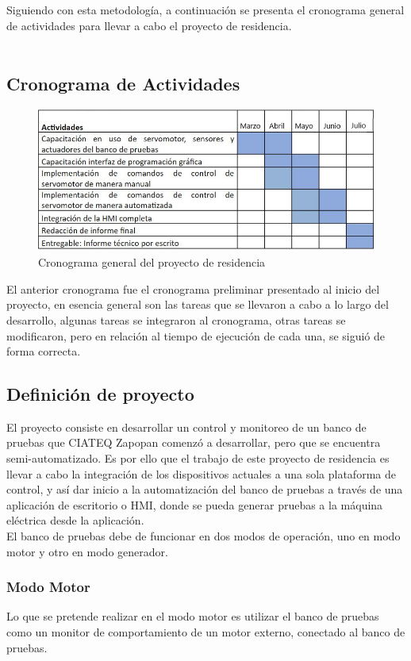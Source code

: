 \documentclass[12pt,titlepage]{article}
\begin{document}
Siguiendo con esta metodología, a  continuación se presenta el cronograma general de actividades para llevar a cabo el proyecto de residencia. \\ \\
\subsection{Cronograma de Actividades}
\begin{figure}[htbp]
\hspace*{0.8cm} 
\includegraphics[scale=0.70]{cronograma}
\caption{Cronograma general del proyecto de residencia}
\end{figure}


El anterior cronograma fue el cronograma preliminar presentado al inicio del proyecto, en esencia general son las tareas que se llevaron a cabo a lo largo del desarrollo, algunas tareas se integraron al cronograma, otras tareas se modificaron, pero en relación al tiempo de ejecución de cada una, se siguió de forma correcta. \\
\newpage
\subsection{Definición de proyecto}
El proyecto consiste en desarrollar un control y monitoreo de un banco de pruebas que CIATEQ Zapopan comenzó a desarrollar, pero que se encuentra semi-automatizado. Es por ello que el trabajo de este proyecto de residencia es llevar a cabo la integración de los dispositivos actuales a una sola plataforma de control, y así dar inicio a la automatización del banco de pruebas a través de una aplicación de escritorio o HMI, donde se pueda generar pruebas a la máquina eléctrica desde la aplicación. \\  

El banco de pruebas debe de funcionar en dos modos de operación, uno en modo motor y otro en modo generador. 
\subsubsection{Modo Motor}
Lo que se pretende realizar en el modo motor es utilizar el banco de pruebas como un monitor de comportamiento de un motor externo, conectado al banco de pruebas. \\
\end{document}
